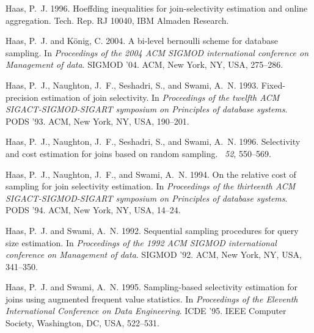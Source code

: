 \begin{thebibliography}{}
{\sc Haas, P.~J.} 1996.
\newblock Hoeffding inequalities for join-selectivity estimation and online
  aggregation.
\newblock Tech. Rep. RJ 10040, IBM Almaden Research.

{\sc Haas, P.~J.} {\sc and} {\sc K\"{o}nig, C.} 2004.
\newblock A bi-level bernoulli scheme for database sampling.
\newblock In {\em Proceedings of the 2004 ACM SIGMOD international conference
  on Management of data}. SIGMOD '04. ACM, New York, NY, USA, 275--286.

{\sc Haas, P.~J.}, {\sc Naughton, J.~F.}, {\sc Seshadri, S.}, {\sc and} {\sc
  Swami, A.~N.} 1993.
\newblock Fixed-precision estimation of join selectivity.
\newblock In {\em Proceedings of the twelfth ACM SIGACT-SIGMOD-SIGART symposium
  on Principles of database systems}. PODS '93. ACM, New York, NY, USA,
  190--201.

{\sc Haas, P.~J.}, {\sc Naughton, J.~F.}, {\sc Seshadri, S.}, {\sc and} {\sc
  Swami, A.~N.} 1996.
\newblock Selectivity and cost estimation for joins based on random sampling.
~{\em 52}, 550--569.

{\sc Haas, P.~J.}, {\sc Naughton, J.~F.}, {\sc and} {\sc Swami, A.~N.} 1994.
\newblock On the relative cost of sampling for join selectivity estimation.
\newblock In {\em Proceedings of the thirteenth ACM SIGACT-SIGMOD-SIGART
  symposium on Principles of database systems}. PODS '94. ACM, New York, NY,
  USA, 14--24.

{\sc Haas, P.~J.} {\sc and} {\sc Swami, A.~N.} 1992.
\newblock Sequential sampling procedures for query size estimation.
\newblock In {\em Proceedings of the 1992 ACM SIGMOD international conference
  on Management of data}. SIGMOD '92. ACM, New York, NY, USA, 341--350.

{\sc Haas, P.~J.} {\sc and} {\sc Swami, A.~N.} 1995.
\newblock Sampling-based selectivity estimation for joins using augmented
  frequent value statistics.
\newblock In {\em Proceedings of the Eleventh International Conference on Data
  Engineering}. ICDE '95. IEEE Computer Society, Washington, DC, USA, 522--531.


\end{thebibliography}
